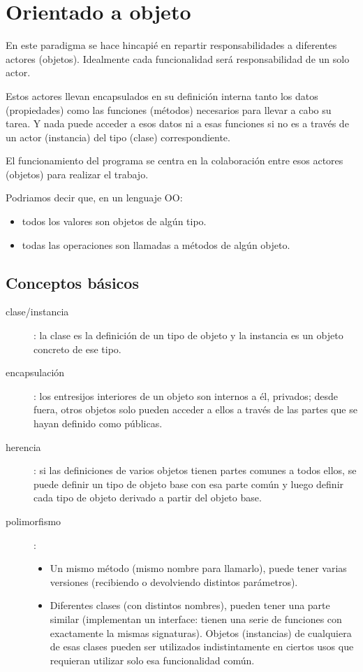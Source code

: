 \documentclass[spanish,12pt,a4paper,final,oneside]{book}
\begin{document}
\section{Orientado a objeto}
En este paradigma se hace hincapié en repartir responsabilidades a diferentes actores (objetos). Idealmente cada funcionalidad será responsabilidad de un solo actor.

Estos actores llevan encapsulados en su definición interna tanto los datos (propiedades) como las funciones (métodos) necesarios para llevar a cabo su tarea. Y nada puede acceder a esos datos ni a esas funciones si no es a través de un actor (instancia) del tipo (clase) correspondiente. 

El funcionamiento del programa se centra en la colaboración entre esos actores (objetos) para realizar el trabajo.

Podriamos decir que, en un lenguaje OO:
\begin{itemize}
\item todos los valores son objetos de algún tipo.
\item todas las operaciones son llamadas a métodos de algún objeto.
\end{itemize}

\subsection*{Conceptos básicos}
\begin{description}
\item[clase/instancia]: la clase es la definición de un tipo de objeto y la instancia es un objeto concreto de ese tipo.
\item[encapsulación]: los entresijos interiores de un objeto son internos a él, privados; desde fuera, otros objetos solo pueden acceder a ellos a través de las partes que se hayan definido como públicas.
\item[herencia]: si las definiciones de varios objetos tienen partes comunes a todos ellos, se puede definir un tipo de objeto base con esa parte común y luego definir cada tipo de objeto derivado a partir del objeto base.
\item[polimorfismo]:
\begin{itemize}
\item Un mismo método (mismo nombre para llamarlo), puede tener varias versiones (recibiendo o devolviendo distintos parámetros). 
\item Diferentes clases (con distintos nombres), pueden tener una parte similar (implementan un interface: tienen una serie de funciones con exactamente la mismas signaturas).  Objetos (instancias) de cualquiera de esas clases pueden ser utilizados indistintamente en ciertos usos que requieran utilizar solo esa funcionalidad común.
\end{itemize}
\end{description}
\end{document}
